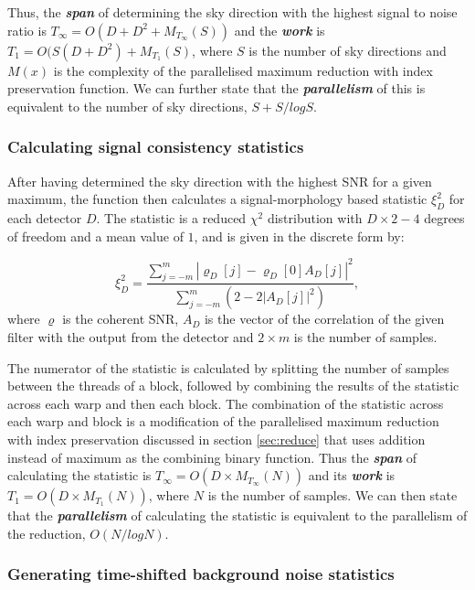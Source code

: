 \documentclass{article}
\begin{document}
Thus, the \textit{\textbf{span}} of determining the sky direction with the highest signal to noise ratio is \(T_\infty = O(D + D^2 + M_{T_\infty}(S))\) and the \textit{\textbf{work}} is \(T_1 = O(S(D + D^2) + M_{T_1}(S)\), where \(S\) is the number of sky directions and \(M(x)\) is the complexity of the parallelised maximum reduction with index preservation function.
We can further state that the \textit{\textbf{parallelism}} of this is equivalent to the number of sky directions, \(S + S/log S\).

\subsubsection{Calculating signal consistency statistics} \label{sec:stat}

After having determined the sky direction with the highest SNR for a given maximum, the function then calculates a signal-morphology based statistic \(\xi_D^2\) for each detector \(D\).
The statistic is a reduced \(\chi^2\) distribution with \(D\times2 - 4\) degrees of freedom and a mean value of \(1\), and is given in the discrete form by:

\[
    \xi_D^2 = \frac{\sum_{j = -m}^{m} | \varrho_D[j] - \varrho_D[0] A_D[j]|^2}{\sum_{j = -m}^{m} (2 - 2|A_D[j]|^2)},
\]
where \(\varrho\) is the coherent SNR, \(A_D\) is the vector of the correlation of the given filter with the output from the detector and \(2\times{m}\) is the number of samples.

The numerator of the statistic is calculated by splitting the number of samples between the threads of a block, followed by combining the results of the statistic across each warp and then each block.
The combination of the statistic across each warp and block is a modification of the parallelised maximum reduction with index preservation discussed in section \ref{sec:reduce} that uses addition instead of maximum as the combining binary function.
Thus the \textit{\textbf{span}} of calculating the statistic is \(T_\infty = O(D\times{M_{T_\infty}(N)})\) and its \textit{\textbf{work}} is \(T_1 = O(D\times{M_{T_1}(N)})\), where \(N\) is the number of samples.
We can then state that the \textit{\textbf{parallelism}} of calculating the statistic is equivalent to the parallelism of the reduction, \(O(N/logN)\).

\subsubsection{Generating time-shifted background noise statistics} \label{sec:background}
\end{document}
